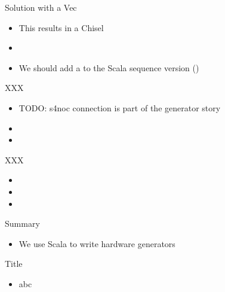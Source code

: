 \begin{frame}[fragile]{Solution with a Vec}
\begin{itemize}
\item This results in a Chisel 
\item
\item We should add a  to the Scala sequence version ()
\end{itemize}
\end{frame}






\begin{frame}[fragile]{XXX}
\begin{itemize}
\item TODO: s4noc connection is part of the generator story
\item
\item
\end{itemize}
\end{frame}

\begin{frame}[fragile]{XXX}
\begin{itemize}
\item
\item
\item
\end{itemize}
\end{frame}




\begin{frame}[fragile]{Summary}
\begin{itemize}
\item We use Scala to write hardware generators
\end{itemize}
\end{frame}




\begin{frame}[fragile]{Title}
\begin{itemize}
\item abc
\end{itemize}
\end{frame}
